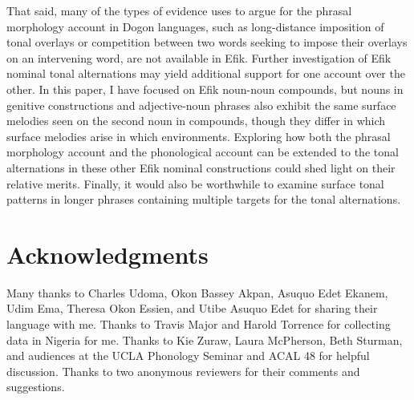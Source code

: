 \documentclass[output=paper]{langscibook}
\begin{document}
That said, many of the types of evidence \citet{McPherson2014} uses to argue for the phrasal morphology account in Dogon languages, such as long-distance imposition of tonal overlays or competition between two words seeking to impose their overlays on an intervening word, are not available in Efik. Further investigation of Efik nominal tonal alternations may yield additional support for one account over the other. In this paper, I have focused on Efik noun-noun compounds, but nouns in genitive constructions and adjective-noun phrases also exhibit the same surface melodies seen on the second noun in compounds, though they differ in which surface melodies arise in which environments. Exploring how both the phrasal morphology account and the phonological account can be extended to the tonal alternations in these other Efik nominal constructions could shed light on their relative merits. Finally, it would also be worthwhile to examine surface tonal patterns in longer phrases containing multiple targets for the tonal alternations.

\section*{Acknowledgments}

Many thanks to Charles Udoma, Okon Bassey Akpan, Asuquo Edet Ekanem, Udim Ema, Theresa Okon Essien, and Utibe Asuquo Edet for sharing their language with me. Thanks to Travis Major and Harold Torrence for collecting data in Nigeria for me. Thanks to Kie Zuraw, Laura McPherson, Beth Sturman, and audiences at the UCLA Phonology Seminar and ACAL 48 for helpful discussion. Thanks to two anonymous reviewers for their comments and suggestions. 
\end{document}
